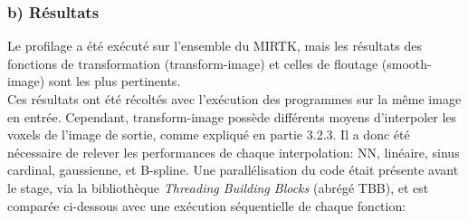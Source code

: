 \documentclass[10pt]{report}
\begin{document}
\subsubsection{b) Résultats}
Le profilage a été exécuté sur l'ensemble du MIRTK, mais les résultats des fonctions de transformation (transform-image) et celles de floutage (smooth-image) sont les plus pertinents. \\
Ces résultats ont été récoltés avec l'exécution des programmes sur la même image en entrée. Cependant, transform-image possède différents moyens d'interpoler les voxels de l'image de sortie, comme expliqué en partie 3.2.3. Il a donc été nécessaire de relever les performances de chaque interpolation: NN, linéaire, sinus cardinal, gaussienne, et B-spline. Une parallélisation du code était présente avant le stage, via la bibliothèque \textit{Threading Building Blocks} (abrégé TBB), et est comparée ci-dessous avec une exécution séquentielle de chaque fonction:
\end{document}

